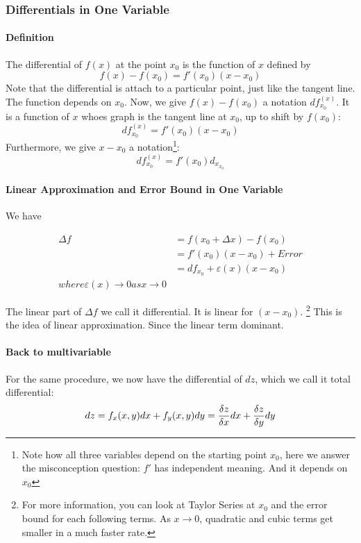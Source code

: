 \documentclass[11pt, oneside]{article}   	%
\begin{document}
\subsubsection{Differentials in One Variable}
\paragraph{Definition} 
The differential of $f(x)$ at the point $x_0$ is the function of $x$ defined by $$f(x) - f(x_0) = f'(x_0)(x-x_0)$$ Note that the differential is attach to a particular point, just like the tangent line. The function depends on $x_0$. Now, we give $f(x) - f(x_0)$ a notation $df_{x_0}^{(x)}$. It is a function of $x$ whoes graph is the tangent line at $x_0$, up to shift by $f(x_0)$: $$ df_{x_0}^{(x)} = f'(x_0)(x-x_0)$$
Furthermore, we give $x-x_0$ a notation\footnote{Note how all three variables depend on the starting point $x_0$, here we answer the misconception question: $f'$ has independent meaning. And it depends on $x_0$}: $$ df_{x_0}^{(x)} = f'(x_0)d_{x_{x_0}}$$
\paragraph{Linear Approximation and Error Bound in One Variable}


We have 

\begin{equation} 
\begin{split}
\Delta f & =f(x_0+\Delta x) - f(x_0) \\
	& = f'(x_0)(x-x_0) + Error \\
	& = df_{x_0} + \varepsilon (x)(x-x_0) \\ 
	where \varepsilon (x)\to 0 as x \to 0
\end{split}
\end{equation}

The linear part of $\Delta f$ we call it differential. It is linear for $(x - x_0)$. \footnote{For more information, you can look at Taylor Series at $x_0$ and the error bound for each following terms. As $x \to 0$, quadratic and cubic terms get smaller in a much faster rate.} This is the idea of linear approximation. Since the linear term dominant. 
\paragraph{Back to multivariable}
For the same procedure, we now have the differential of $dz$, which we call it total differential: $$dz = f_x(x,y)dx + f_y(x,y)dy = {\delta z \over \delta x} dx +  {\delta z \over \delta y} dy$$
\end{document}
